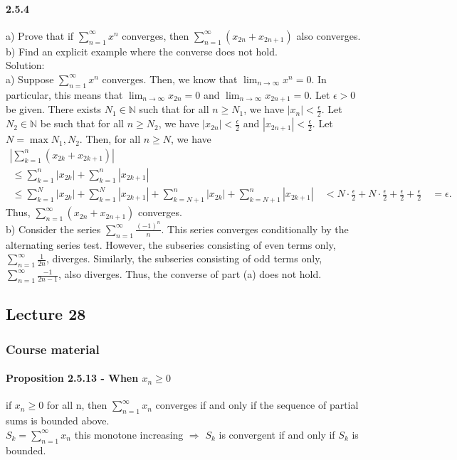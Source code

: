 \documentclass{article}
\begin{document}
\paragraph{2.5.4}
a) Prove that if $\sum_{n=1}^{\infty}x^n$ converges, then $\sum_{n=1}^{\infty}(x_{2n}+x_{2n+1})$ also converges.\\
b) Find an explicit example where the converse does not hold.\\
Solution:\\
a) Suppose $\sum_{n=1}^{\infty}x^n$ converges. Then, we know that $\lim_{n\to\infty}x^n=0$. In particular, this means that $\lim_{n\to\infty}x_{2n}=0$ and $\lim_{n\to\infty}x_{2n+1}=0$. Let $\epsilon>0$ be given. There exists $N_1\in\mathbb{N}$ such that for all $n\geq N_1$, we have $|x_n|<\frac{\epsilon}{2}$. Let $N_2\in\mathbb{N}$ be such that for all $n\geq N_2$, we have $|x_{2n}|<\frac{\epsilon}{2}$ and $|x_{2n+1}|<\frac{\epsilon}{2}$. Let $N=\max{N_1,N_2}$. Then, for all $n\geq N$, we have
\begin{align*}
\left|\sum_{k=1}^n(x_{2k}+x_{2k+1})\right|&\\\ \leq\sum_{k=1}^n|x_{2k}|+\sum_{k=1}^n|x_{2k+1}|\
&\\\ \leq\sum_{k=1}^N|x_{2k}|+\sum_{k=1}^N|x_{2k+1}|+\sum_{k=N+1}^n|x_{2k}|+\sum_{k=N+1}^n|x_{2k+1}|\
&<N\cdot\frac{\epsilon}{2}+N\cdot\frac{\epsilon}{2}+\frac{\epsilon}{2}+\frac{\epsilon}{2}\
&=\epsilon.
\end{align*}
Thus, $\sum_{n=1}^{\infty}(x_{2n}+x_{2n+1})$ converges.\\
b) Consider the series $\sum_{n=1}^{\infty}\frac{(-1)^n}{n}$. This series converges conditionally by the alternating series test. However, the subseries consisting of even terms only, $\sum_{n=1}^{\infty}\frac{1}{2n}$, diverges. Similarly, the subseries consisting of odd terms only, $\sum_{n=1}^{\infty}\frac{-1}{2n-1}$, also diverges. Thus, the converse of part (a) does not hold.
\subsection{Lecture 28}
\subsubsection{Course material}
\paragraph{Proposition 2.5.13 - When $x_n\ge 0$}
if $x_n\ge 0$ for all n, then $\sum_{n=1}^{\infty}x_n$ converges if and only if the sequence of  partial sums is bounded above.\\
$S_k=\sum_{n=1}^{\infty}x_n$ this monotone increasing $\Longrightarrow$ $S_k$ is convergent if and only if $S_k$ is bounded.
\end{document}
